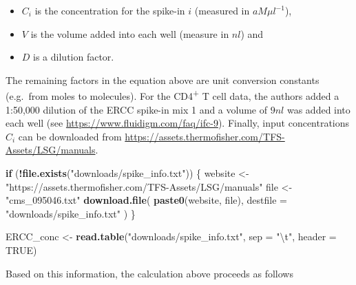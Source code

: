 \documentclass[9pt,a4paper,]{extarticle}
\newenvironment{Shaded}{\begin{snugshade}}{\end{snugshade}}
\newcommand{\CharTok}[1]{\textcolor[rgb]{0.31,0.60,0.02}{#1}}
\newcommand{\ControlFlowTok}[1]{\textcolor[rgb]{0.13,0.29,0.53}{\textbf{#1}}}
\newcommand{\DataTypeTok}[1]{\textcolor[rgb]{0.13,0.29,0.53}{#1}}
\newcommand{\KeywordTok}[1]{\textcolor[rgb]{0.13,0.29,0.53}{\textbf{#1}}}
\newcommand{\NormalTok}[1]{#1}
\newcommand{\OperatorTok}[1]{\textcolor[rgb]{0.81,0.36,0.00}{\textbf{#1}}}
\newcommand{\OtherTok}[1]{\textcolor[rgb]{0.56,0.35,0.01}{#1}}
\newcommand{\StringTok}[1]{\textcolor[rgb]{0.31,0.60,0.02}{#1}}
\begin{document}
\begin{itemize}
\item
  \(C_i\) is the concentration for the spike-in \(i\) (measured in \(aM\mu{}l^{-1}\)),
\item
  \(V\) is the volume added into each well (measure in \(nl\)) and
\item
  \(D\) is a dilution factor.
\end{itemize}

The remaining factors in the equation above are unit conversion constants
(e.g.~from moles to molecules).
For the CD4\textsuperscript{+} T cell data, the authors added a 1:50,000 dilution of the ERCC
spike-in mix 1 and a volume of \(9nl\) was added into each well (see \url{https://www.fluidigm.com/faq/ifc-9}).
Finally, input concentrations \(C_i\) can be downloaded from
\href{https://assets.thermofisher.com/TFS-Assets/LSG/manuals/cms_095046.txt}{https://assets.thermofisher.com/TFS-Assets/LSG/manuals}.

\begin{Shaded}
\begin{Highlighting}[]
\ControlFlowTok{if}\NormalTok{ (}\OperatorTok{!}\KeywordTok{file.exists}\NormalTok{(}\StringTok{"downloads/spike_info.txt"}\NormalTok{)) \{}
\NormalTok{  website <-}\StringTok{ "https://assets.thermofisher.com/TFS-Assets/LSG/manuals"}
\NormalTok{  file <-}\StringTok{ "cms_095046.txt"}
  \KeywordTok{download.file}\NormalTok{(}
    \KeywordTok{paste0}\NormalTok{(website, file),}
    \DataTypeTok{destfile =} \StringTok{"downloads/spike_info.txt"}
\NormalTok{  )  }
\NormalTok{\}}

\NormalTok{ERCC_conc <-}\StringTok{ }\KeywordTok{read.table}\NormalTok{(}\StringTok{"downloads/spike_info.txt"}\NormalTok{, }\DataTypeTok{sep =} \StringTok{"}\CharTok{\textbackslash{}t}\StringTok{"}\NormalTok{, }\DataTypeTok{header =} \OtherTok{TRUE}\NormalTok{)}
\end{Highlighting}
\end{Shaded}

Based on this information, the calculation above proceeds as follows
\end{document}
